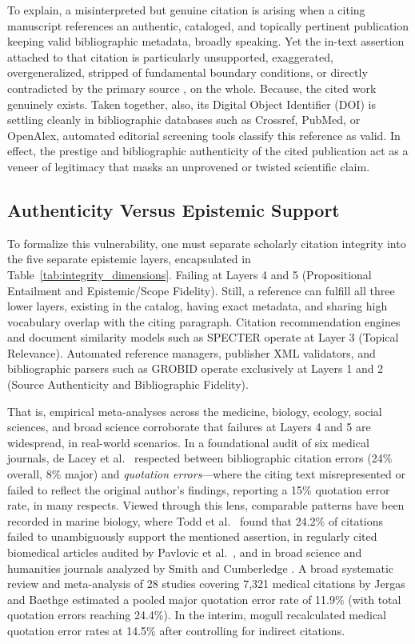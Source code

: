 \documentclass[journal]{IEEEtran}
\begin{document}
To explain, a misinterpreted but genuine citation is arising when a citing manuscript references an authentic, cataloged, and topically pertinent publication keeping valid bibliographic metadata, broadly speaking. Yet the in-text assertion attached to that citation is particularly unsupported, exaggerated, overgeneralized, stripped of fundamental boundary conditions, or directly contradicted by the primary source \cite{greenberg2009citation,rekdal2014sinking,pavlovic2021accurate}, on the whole. Because, the cited work genuinely exists. Taken together, also, its Digital Object Identifier (DOI) is settling cleanly in bibliographic databases such as Crossref, PubMed, or OpenAlex, automated editorial screening tools classify this reference as valid. In effect, the prestige and bibliographic authenticity of the cited publication act as a veneer of legitimacy that masks an unprovened or twisted scientific claim.

\subsection{Authenticity Versus Epistemic Support}
To formalize this vulnerability, one must separate scholarly citation integrity into the five separate epistemic layers, encapsulated in Table~\ref{tab:integrity_dimensions}. Failing at Layers 4 and 5 (Propositional Entailment and Epistemic/Scope Fidelity). Still, a reference can fulfill all three lower layers, existing in the catalog, having exact metadata, and sharing high vocabulary overlap with the citing paragraph. Citation recommendation engines and document similarity models such as SPECTER \cite{cohan2020specter} operate at Layer 3 (Topical Relevance). Automated reference managers, publisher XML validators, and bibliographic parsers such as GROBID \cite{lopez2009grobid} operate exclusively at Layers 1 and 2 (Source Authenticity and Bibliographic Fidelity).

That is, empirical meta-analyses across the medicine, biology, ecology, social sciences, and broad science corroborate that failures at Layers 4 and 5 are widespread, in real-world scenarios. In a foundational audit of six medical journals, de Lacey et al.\ \cite{delacey1985accurate} respected between bibliographic citation errors (24\% overall, 8\% major) and \emph{quotation errors}---where the citing text misrepresented or failed to reflect the original author's findings, reporting a 15\% quotation error rate, in many respects. Viewed through this lens, comparable patterns have been recorded in marine biology, where Todd et al.\ \cite{todd2010marine} found that 24.2\% of citations failed to unambiguously support the mentioned assertion, in regularly cited biomedical articles audited by Pavlovic et al.\ \cite{pavlovic2021accurate}, and in broad science and humanities journals analyzed by Smith and Cumberledge \cite{smith2020quotation}. A broad systematic review and meta-analysis of 28 studies covering 7,321 medical citations by Jergas and Baethge \cite{jergas2015quotation} estimated a pooled major quotation error rate of 11.9\% (with total quotation errors reaching 24.4\%). In the interim, mogull \cite{mogull2017accuracy} recalculated medical quotation error rates at 14.5\% after controlling for indirect citations.
\end{document}
